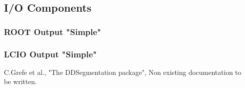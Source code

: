 \documentclass[10pt,a4paper]{article}
\begin{document}
\newpage

\subsection{I/O Components}
\noindent

\subsubsection{ROOT Output "Simple"}
\label{sec:ddg4-components-IO-ROOT-simple}
\noindent

\subsubsection{LCIO Output "Simple"}
\label{sec:ddg4-components-IO-LCIO-simple}
\noindent



\newpage
\begin{thebibliography}{9}

 C.Grefe et al.,
                   "The DDSegmentation package", 
                   Non existing documentation to be written.
\end{thebibliography}
\end{document}
